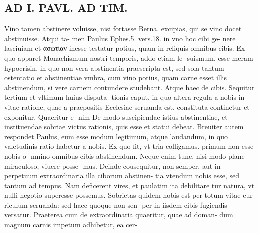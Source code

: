 \documentclass{article}
\begin{document}
\begin{pages}
\section*{AD I. PAVL. AD TIM. }
\marginpar{[ p.300 ]}\pstart Vino tamen abstinere voluisse, nisi fortasse Berna. excipias, qui se vino docet abstinuisse. Atqui ta- men Paulus Ephes.5. vers.18. in vno hoc cibi ge- nere lasciuiam et ἀσωτίαν inesse testatur potius, quam in reliquis omnibus cibis. Ex quo apparet Monachismum nostri temporis, addo etiam le- suismum, esse meram hypocrisin, in quo non vera abstinentia praescripta est, sed sola tantum ostentatio et abstinentiae vmbra, cum vino potius, quam carne esset illis abstinendum, si vere carnem contundere studebant. Atque haec de cibis. Sequitur tertium et vltimum huius disputa- tionis caput, in quo altera regula a nobis in vitae ratione, quae a praepositis Ecclesiae seruanda est, constituta continetur et exponitur. Quaeritur e- nim De modo suscipiendae istius abstinentiae, et instituendae sobriae victus rationis, quis esse et statui debeat. Breuiter autem respondet Paulus, eum esse modum legitimum, atque laudandum, in quo valetudinis ratio habetur a nobis. Ex quo fit, vt tria colligamus. primum non esse nobis o- mnino omnibus cibis abstinendum. Neque enim tunc, nisi modo plane miraculoso, viuere posse- mus. Deinde cousequitur, non semper, aut in perpetuum extraordinaria illa ciborum abstinen- tia vtendum nobis esse, sed tantum ad tempus. Nam deficerent vires, et paulatim ita debilitare tur natura, vt nulli negotio superesse possemus. Sobrietas quidem nobis est per totum vitae cur- riculum seruanda: sed haec quoque non sen- per in iisdem cibis fugiendis versatur. Praeterea cum de extraordinaria quaeritur, quae ad doman- dum magnum carnis impetum adhibetur, ea cer-  \pend

\end{pages}
\end{document}
